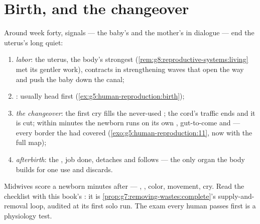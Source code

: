\section{Birth, and the changeover}

\begin{proposition}\label{prop:g8:from-egg-to-birth:birth}
Around week forty,  signals --- the baby's and
the mother's in dialogue --- end the uterus's long quiet:
\begin{enumerate}
  \item \emph{labor}: the uterus, the body's strongest
         (\cref{rem:g8:reproductive-systems:living}
        met its gentler work), contracts in strengthening
        waves that open the way and push the baby down
        the  canal;
  \item \emph{}: usually head first
        (\cref{ex:g5:human-reproduction:birth});
  \item \emph{the changeover}: the first cry fills the
        never-used ; the cord's traffic ends and it
        is cut; within minutes the newborn runs on its
        own , gut-to-come and  --- every
        border the  had covered
        (\cref{exo:g5:human-reproduction:11}, now with
        the full map);
  \item \emph{afterbirth}: the , job done,
        detaches and follows --- the only organ the body
        builds for one use and discards.
\end{enumerate}
\end{proposition}
\admitted

\begin{example}\label{ex:g8:from-egg-to-birth:audit}
Midwives score a newborn minutes after  ---
, , color, movement, cry. Read the
checklist with this book's : it is
\cref{prop:g7:removing-wastes:complete}'s
supply-and-removal loop, audited at its first solo run.
The exam every human passes first is a physiology test.
\end{example}

